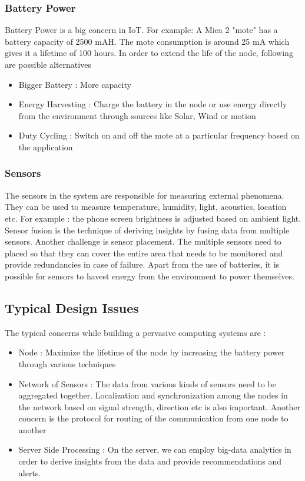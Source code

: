 \documentclass[twoside]{article}
\begin{document}
\subsubsection{Battery Power}
Battery Power is a big concern in IoT. For example: A Mica 2 "mote" has a battery capacity of 2500 mAH. The mote consumption is around 25 mA which gives it a lifetime of 100 hours. In order to extend the life of the node, following are possible alternatives
\begin{itemize}
    \item Bigger Battery : More capacity
    \item Energy Harvesting : Charge the battery in the node or use energy directly from the environment through sources like Solar, Wind or motion
    \item Duty Cycling : Switch on and off the mote at a particular frequency based on the application
\end{itemize}


\subsubsection{Sensors}
The sensors in the system are responsible for measuring external phenomena. They can be used to measure temperature, humidity, light, acoustics, location etc. For example : the phone screen brightness is adjusted based on ambient light. \\
Sensor fusion is the technique of deriving insights by fusing data from multiple sensors. Another challenge is sensor placement. The multiple sensors need to placed so that they can cover the entire area that needs to be monitored and provide redundancies in case of failure.
Apart from the use of batteries, it is possible for sensors to havest energy from the environment to power themselves. 

\subsection{Typical Design Issues}

The typical concerns while building a pervasive computing systems are :
\begin{itemize}
    \item Node : Maximize the lifetime of the node by increasing the battery power through various techniques
    \item Network of Sensors : The data from various kinds of sensors need to be aggregated together. Localization and synchronization among the nodes in the network based on signal strength, direction etc is also important. Another concern is the protocol for routing of the communication from one node to another
    \item Server Side Processing : On the server, we can employ big-data analytics in order to derive insights from the data and provide recommendations and alerts.
\end{itemize}
\end{document}
